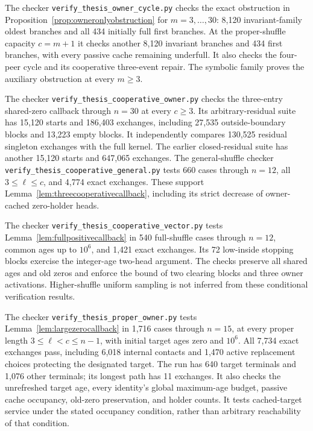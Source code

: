 \documentclass[11pt]{article}
\begin{document}
The checker \texttt{verify\_thesis\_owner\_cycle.py}
checks the exact obstruction in
Proposition~\ref{prop:owneronlyobstruction} for
$m=3,\ldots,30$: 8,120 invariant-family oldest
branches and all 434 initially full first branches.
At the proper-shuffle capacity $c=m+1$ it checks
another 8,120 invariant branches and 434 first branches,
with every passive cache remaining underfull.
It also checks the four-peer cycle and its cooperative
three-event repair. The symbolic family proves the
auxiliary obstruction at every $m\ge3$.

The checker \texttt{verify\_thesis\_cooperative\_owner.py}
checks the three-entry shared-zero callback through
$n=30$ at every $c\ge3$. Its arbitrary-residual suite
has 15,120 starts and 186,403 exchanges, including
27,535 outside-boundary blocks and 13,223 empty blocks.
It independently compares 130,525 residual singleton
exchanges with the full kernel. The earlier closed-residual
suite has another 15,120 starts and 647,065 exchanges.
The general-shuffle checker
\texttt{verify\_thesis\_cooperative\_general.py}
tests 660 cases through $n=12$, all $3\le\ell\le c$,
and 4,774 exact exchanges. These support
Lemma~\ref{lem:threecooperativecallback}, including
its strict decrease of owner-cached zero-holder heads.

The checker \texttt{verify\_thesis\_cooperative\_vector.py}
tests Lemma~\ref{lem:fullpositivecallback} in 540
full-shuffle cases through $n=12$, common ages up to
$10^6$, and 1,421 exact exchanges. Its 72 low-inside
stopping blocks exercise the integer-age two-head
argument. The checks preserve all shared ages and
old zeros and enforce the bound of two clearing
blocks and three owner activations. Higher-shuffle
uniform sampling is not inferred from these
conditional verification results.

The checker \texttt{verify\_thesis\_proper\_owner.py}
tests Lemma~\ref{lem:largezerocallback} in 1,716 cases
through $n=15$, at every proper length
$3\le\ell<c\le n-1$, with initial target ages zero
and $10^6$. All 7,734 exact exchanges pass, including
6,018 internal contacts and 1,470 active replacement
choices protecting the designated target. The run
has 640 target terminals and 1,076 other terminals;
its longest path has 11 exchanges. It also checks
the unrefreshed target age, every identity's global
maximum-age budget, passive cache occupancy, old-zero
preservation, and holder counts. It tests cached-target
service under the stated occupancy condition, rather
than arbitrary reachability of that condition.
\end{document}
